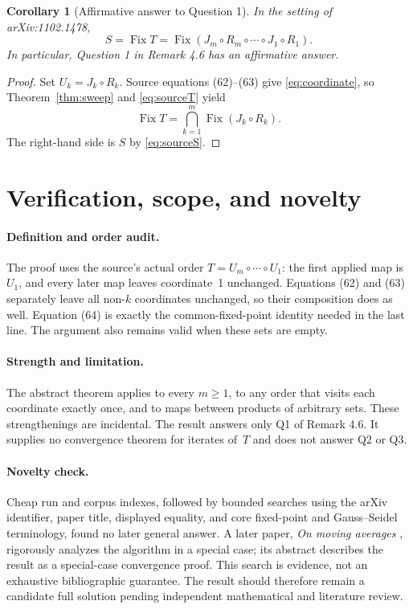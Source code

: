 \documentclass[11pt]{article}
\newtheorem{corollary}[theorem]{Corollary}
\newcommand{\Fix}{\operatorname{Fix}}
\begin{document}
\begin{corollary}[Affirmative answer to Question 1]
In the setting of arXiv:1102.1478,
\[
 \boxed{S=\Fix T=\Fix(J_m\circ R_m\circ\cdots\circ J_1\circ R_1).}
\]
In particular, Question 1 in Remark 4.6 has an affirmative answer.
\end{corollary}

\begin{proof}
Set \(U_k=J_k\circ R_k\). Source equations (62)--(63) give
\eqref{eq:coordinate}, so Theorem~\ref{thm:sweep} and
\eqref{eq:sourceT} yield
\[
 \Fix T=\bigcap_{k=1}^m\Fix(J_k\circ R_k).
\]
The right-hand side is \(S\) by \eqref{eq:sourceS}.
\end{proof}

\section{Verification, scope, and novelty}

\paragraph{Definition and order audit.}
The proof uses the source's actual order
\(T=U_m\circ\cdots\circ U_1\): the first applied map is~\(U_1\), and
every later map leaves coordinate~1 unchanged. Equations (62) and (63)
separately leave all non-\(k\) coordinates unchanged, so their composition
does as well. Equation (64) is exactly the common-fixed-point identity
needed in the last line. The argument also remains valid when these sets
are empty.

\paragraph{Strength and limitation.}
The abstract theorem applies to every \(m\geq1\), to any order that visits
each coordinate exactly once, and to maps between products of arbitrary
sets. These strengthenings are incidental. The result answers only Q1 of
Remark 4.6. It supplies no convergence theorem for iterates of~$T$ and
does not answer Q2 or Q3.

\paragraph{Novelty check.}
Cheap run and corpus indexes, followed by bounded searches using the arXiv
identifier, paper title, displayed equality, and core fixed-point and
Gauss--Seidel terminology, found no later general answer. A later paper,
\emph{On moving averages} \cite{moving}, rigorously analyzes the algorithm
in a special case; its abstract describes the result as a special-case
convergence proof. This search is evidence, not an exhaustive
bibliographic guarantee. The result should therefore remain a candidate
full solution pending independent mathematical and literature review.
\end{document}
